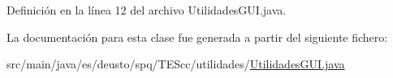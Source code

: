 Definición en la línea 12 del archivo Utilidades\+G\+U\+I.\+java.



La documentación para esta clase fue generada a partir del siguiente fichero\+:\begin{DoxyCompactItemize}
\item 
src/main/java/es/deusto/spq/\+T\+E\+Scc/utilidades/\hyperlink{_utilidades_g_u_i_8java}{Utilidades\+G\+U\+I.\+java}\end{DoxyCompactItemize}
